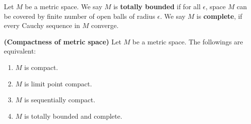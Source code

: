 \documentclass{report}
\begin{document}
Let $M$ be a metric space.  We say $M$ is \textbf{totally bounded} if for all $\epsilon $, space $M$ can be covered by finite number of open balls of radius $\epsilon $. We say $M$ is  \textbf{complete}, if every Cauchy sequence in $M$ converge.  
\begin{equiv_def}
\label{Com}
\textbf{(Compactness of metric space)} Let $M$ be a metric space. The followings are equivalent: 
\begin{enumerate}[label=(\roman*)]
  \item $M$ is compact. 
  \item $M$ is limit point compact. 
  \item $M$ is sequentially compact. 
  \item $M$ is totally bounded and complete. 
\end{enumerate}
\end{equiv_def}
\end{document}
